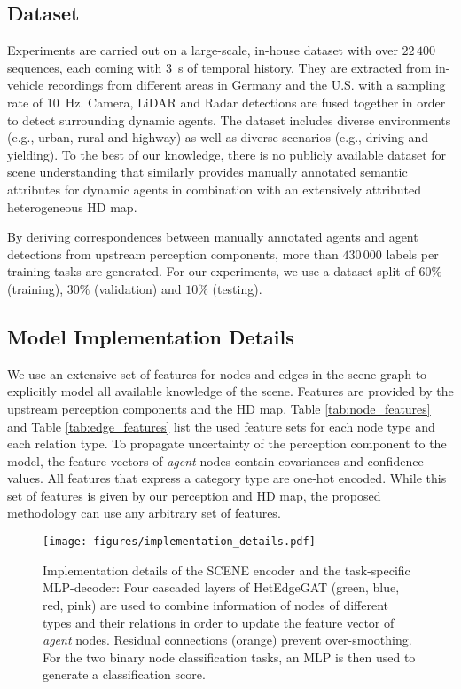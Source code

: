 \documentclass[letterpaper, 10 pt, journal, twoside]{IEEEtran}
\begin{document}
\subsection{Dataset}
Experiments are carried out on a large-scale, in-house dataset with over $22\,400$ sequences, each coming with \SI{3}{s} of temporal history.
They are extracted from in-vehicle recordings from different areas in Germany and the U.S. with a sampling rate of \SI{10}{Hz}.
Camera, LiDAR and Radar detections are fused together in order to detect surrounding dynamic agents.
The dataset includes diverse environments (e.g., urban, rural and highway) as well as diverse scenarios (e.g., driving and yielding).
To the best of our knowledge, there is no publicly available dataset for scene understanding that similarly provides manually annotated semantic attributes for dynamic agents in combination with an extensively attributed heterogeneous HD map.

By deriving correspondences between manually annotated agents and agent detections from upstream perception components, more than $430\,000$ labels per training tasks are generated.
For our experiments, we use a dataset split of $60\%$ (training), $30\%$ (validation) and $10\%$ (testing).

\subsection{Model Implementation Details}
We use an extensive set of features for nodes and edges in the scene graph to explicitly model all available knowledge of the scene.
Features are provided by the upstream perception components and the HD map.
Table \ref{tab:node_features} and Table \ref{tab:edge_features} list the used feature sets for each node type and each relation type.
To propagate uncertainty of the perception component to the model, the feature vectors of \textit{agent} nodes contain covariances and confidence values.
All features that express a category type are one-hot encoded.
While this set of features is given by our perception and HD map, the proposed methodology can use any arbitrary set of features.

\begin{figure*}[thpb]
	\centering
	\texttt{[image: figures/implementation\_details.pdf]}
	\vspace{-0.6cm}
	\caption{Implementation details of the SCENE encoder and the task-specific MLP-decoder: Four cascaded layers of HetEdgeGAT (green, blue, red, pink) are used to combine information of nodes of different types and their relations in order to update the feature vector of \textit{agent} nodes. Residual connections (orange) prevent over-smoothing. For the two binary node classification tasks, an MLP is then used to generate a classification score.}
	\label{fig:implementation_details}
	\vspace{-0.1cm}
\end{figure*}
\end{document}
